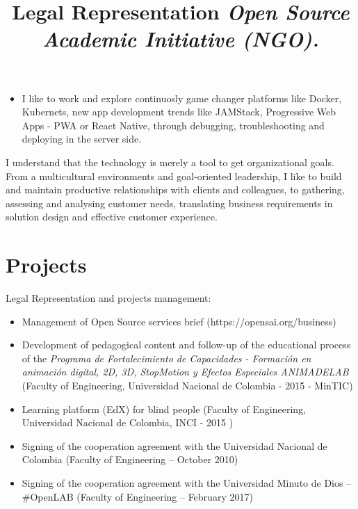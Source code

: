 \documentclass[overlapped,line,final]{res}
\begin{document}
\begin{resume}
\begin{itemize}
    \item I like to work and explore continuosly game changer platforms like Docker, Kubernets, new app development trends like JAMStack, Progressive Web Apps - PWA or React Native, through debugging, troubleshooting and deploying in the server side.
\end{itemize}
    
I understand that the technology is merely a tool to get organizational goals. From a multicultural environments and goal-oriented leadership, I like to build and maintain productive relationships with clients and colleagues, to gathering, assessing and analysing customer needs, translating business requirements in solution design and effective customer experience.

\vspace{0.5cm}
\section{\sc Projects } %
\vspace{0.5cm}
\title{\bf Legal Representation
	\newline \em Open Source Academic Initiative (NGO).
}
\begin{position}
Legal Representation and projects management:

\begin{itemize}
\item Management of Open Source services brief (https://opensai.org/business)
\item Development of pedagogical content and follow-up of the educational process of the \textit{Programa de Fortalecimiento de Capacidades - Formación en animación digital, 2D, 3D, StopMotion y Efectos Especiales ANIMADELAB} (Faculty of Engineering, Universidad Nacional de Colombia - 2015 - MinTIC)
\item Learning platform (EdX) for blind people (Faculty of Engineering, Universidad Nacional de Colombia, INCI - 2015 )
\item Signing of the cooperation agreement with the Universidad Nacional de Colombia (Faculty of Engineering – October 2010)
\item Signing of the cooperation agreement with the Universidad Minuto de Dios – \#OpenLAB (Faculty of Engineering – February 2017)
\end{itemize}


\end{position}
\end{resume}
\end{document}
